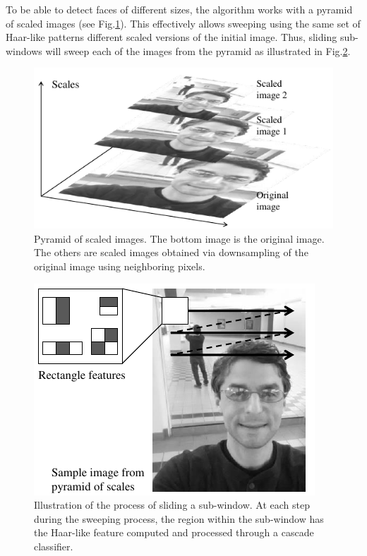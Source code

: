 \documentclass[conference]{IEEEtran}
\begin{document}
To be able to detect faces of different sizes, the algorithm works with a pyramid of scaled images (see Fig.\ref{fig_pyramid}). This effectively allows sweeping using the same set of Haar-like patterns different scaled versions of the initial image. Thus, sliding sub-windows will sweep each of the images from the pyramid as illustrated in Fig.\ref{fig_sliding}. 


\begin{figure}[!htb]
\centering
	\includegraphics[scale=1.0]{fig_pyramid}
\caption{Pyramid of scaled images. The bottom image is the original image. The others are scaled images obtained via downsampling of the original image using neighboring pixels.}
\label{fig_pyramid}
\end{figure}

\begin{figure}[!htb]
\centering
	\includegraphics[scale=1.0]{fig_sliding}
\caption{Illustration of the process of sliding a sub-window. At each step during the sweeping process, the region within the sub-window has the Haar-like feature computed and processed through a cascade classifier.}
\label{fig_sliding}
\end{figure}
\end{document}
